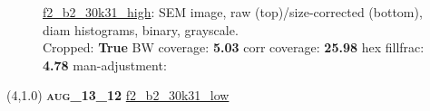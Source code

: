 \begin{figure}[h!]
\label{semimg29}
\caption*{\hyperlink{covtableaug_13_12}{\color{blue} \small \ttfamily f2\_b2\_30k31\_high}: SEM image, raw (top)/size-corrected (bottom), diam histograms, binary, grayscale.\\Cropped: {\bf True} \;\; BW coverage: {\bf 5.03} \:\: corr coverage: {\bf 25.98} \:\: hex fillfrac: {\bf 4.78} \:\: man-adjustment: {\bf \color{blue}{Yes}}}
\end{figure}
\newpage

\begin{textblock}{5}(4,1.0)
{\bf \textsc{aug\_13\_12}}
\hspace{4.5cm}
\hyperlink{covtableaug_13_12}{\color{blue} \large \ttfamily f2\_b2\_30k31\_low}
\end{textblock}

